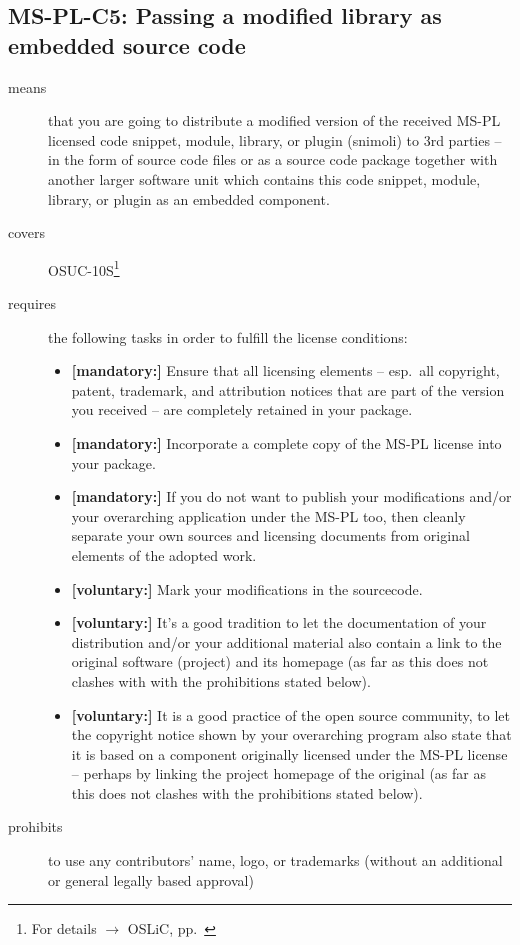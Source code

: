 \subsection{MS-PL-C5: Passing a modified library as embedded source code}
\label{OSUC-10S-MS-PL}
\begin{description}
\item[means] that you are going to distribute a modified version of the received
MS-PL licensed code snippet, module, library, or plugin (snimoli) to 3rd parties
-- in the form of source code files or as a source code package together with
another larger software unit which contains this code snippet, module, library,
or plugin as an embedded component.

\item[covers] OSUC-10S\footnote{For details $\rightarrow$ OSLiC, pp.\
\pageref{OSUC-10S-DEF}}
\item[requires] the following tasks in order to fulfill the license conditions:
\begin{itemize}
 
 \item \textbf{[mandatory:]} Ensure that all licensing elements -- esp.\ all
  copyright, patent, trademark, and attribution notices that are part of the
  version you received -- are completely retained in your package.
 
  \item \textbf{[mandatory:]} Incorporate a complete copy of the MS-PL license
  into your package.
  
  \item \textbf{[mandatory:]} If you do not want to publish your modifications
  and/or your overarching application under the MS-PL too, then cleanly separate
  your own sources and licensing documents from original elements of the adopted
  work.
  
  \item \textbf{[voluntary:]} Mark your modifications in the sourcecode.
  
  \item \textbf{[voluntary:]} It's a good tradition to let the documentation of
  your distribution and/or your additional material also contain a link to the
  original software (project) and its homepage (as far as this does not clashes
  with with the prohibitions stated below).

  \item \textbf{[voluntary:]} It is a good practice of the open source
  community, to let the copyright notice shown by your overarching program also
  state that it is based on a component originally licensed under the MS-PL
  license -- perhaps by linking the project homepage of the original (as far as
  this does not clashes with the prohibitions stated below).
  
\end{itemize}

\item[prohibits] to use any contributors' name, logo, or trademarks (without an
additional or general legally based approval)

\end{description}

